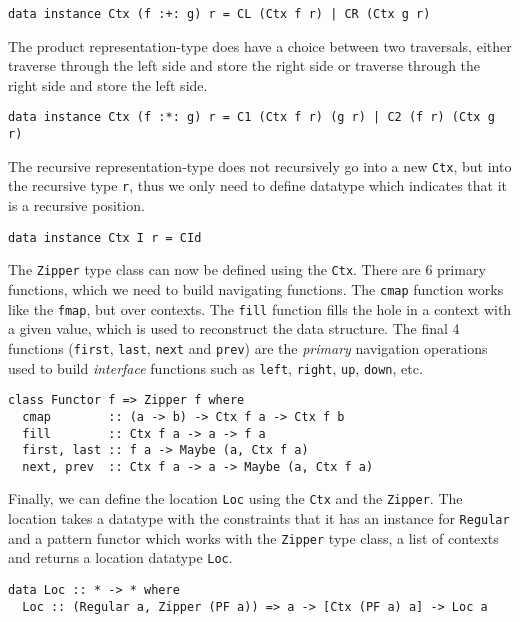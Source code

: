 \begin{verbatim}
data instance Ctx (f :+: g) r = CL (Ctx f r) | CR (Ctx g r)
\end{verbatim}

The product representation-type does have a choice between two traversals, either traverse through the left side and store the right side or traverse through the right side and store the left side.

\begin{verbatim}
data instance Ctx (f :*: g) r = C1 (Ctx f r) (g r) | C2 (f r) (Ctx g r)
\end{verbatim}

The recursive representation-type does not recursively go into a new \texttt{Ctx}, but into the recursive type \texttt{r}, thus we only need to define datatype which indicates that it is a recursive position.

\begin{verbatim}
data instance Ctx I r = CId
\end{verbatim}

The \texttt{Zipper} type class can now be defined using the \texttt{Ctx}. There are 6 primary functions, which we need to build navigating functions. The \texttt{cmap} function works like the \texttt{fmap}, but over contexts. The \texttt{fill} function fills the hole in a context with a given value, which is used to reconstruct the data structure. The final 4 functions (\texttt{first}, \texttt{last}, \texttt{next} and \texttt{prev}) are the \textit{primary} navigation operations used to build \textit{interface} functions such as \texttt{left}, \texttt{right}, \texttt{up}, \texttt{down}, etc.

\pagebreak
\begin{verbatim}
class Functor f => Zipper f where
  cmap        :: (a -> b) -> Ctx f a -> Ctx f b
  fill        :: Ctx f a -> a -> f a
  first, last :: f a -> Maybe (a, Ctx f a)
  next, prev  :: Ctx f a -> a -> Maybe (a, Ctx f a)
\end{verbatim}

Finally, we can define the location \texttt{Loc} using the \texttt{Ctx} and the \texttt{Zipper}. The location takes a datatype with the constraints that it has an instance for \texttt{Regular} and a pattern functor which works with the \texttt{Zipper} type class, a list of contexts and returns a location datatype \texttt{Loc}.

\begin{verbatim}
data Loc :: * -> * where
  Loc :: (Regular a, Zipper (PF a)) => a -> [Ctx (PF a) a] -> Loc a
\end{verbatim}

